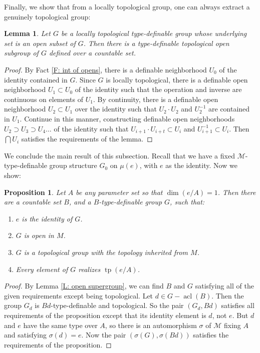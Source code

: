 \documentclass{amsart}
\newtheorem{lemma}[theorem]{Lemma}
\newtheorem{proposition}[theorem]{Proposition}
\theoremstyle{definition}
\newcommand{\acl}{\operatorname{acl}}
\newcommand{\tp}{\operatorname{tp}}
\begin{document}
    Finally, we show that from a locally topological group, one can always extract a genuinely topological group:

    \begin{lemma}\label{L: top gp}
        Let $G$ be a locally topological type-definable group whose underlying set is an open subset of $G$. Then there is a type-definable topological open subgroup of $G$ defined over a countable set.
    \end{lemma}
\begin{proof}
    By Fact \ref{F: int of opens}, there is a definable neighborhood $U_0$ of the identity contained in $G$. Since $G$ is locally topological, there is a definable open neighborhood $U_1\subset U_0$ of the identity such that the operation and inverse are continuous on elements of $U_1$. By continuity, there is a definable open neighborhood $U_2\subset U_1$ over the identity such that $U_2\cdot U_2$ and $U_2^{-1}$ are contained in $U_1$. Continue in this manner, constructing definable open neighborhoods $U_2\supset U_3\supset U_4\dots$ of the identity such that $U_{i+1}\cdot U_{i+t}\subset U_i$ and $U_{i+1}^{-1}\subset U_i$. Then $\bigcap U_i$ satisfies the requirements of the lemma.
\end{proof}

We conclude the main result of this subsection. Recall that we have a fixed $\mathcal M$-type-definable group structure $G_0$ on $\mu(e)$, with $e$ as the identity. Now we show:

\begin{proposition}\label{P: top gp}
    Let $A$ be any parameter set so that $\dim(e/A)=1$. Then there are a countable set $B$, and a $B$-type-definable group $G$, such that:
    \begin{enumerate}
        \item $e$ is the identity of $G$.
        \item $G$ is open in $M$.
        \item $G$ is a topological group with the topology inherited from $M$.
        \item Every element of $G$ realizes $\tp(e/A)$.
    \end{enumerate}
\end{proposition}
\begin{proof}
  By Lemma \ref{L: open supergroup}, we can find $B$ and $G$ satisfying all of the given requirements except being topological. Let $d\in G-\acl(B)$. Then the group $G_d$ is $Bd$-type-definable and topological. So the pair $(G_d,Bd)$ satisfies all requirements of the proposition except that its identity element is $d$, not $e$. But $d$ and $e$ have the same type over $A$, so there is an automorphism $\sigma$ of $\mathcal M$ fixing $A$ and satisfying $\sigma(d)=e$. Now the pair $(\sigma(G),\sigma(Bd))$ satisfies the requirements of the proposition.   
\end{proof}
\end{document}
